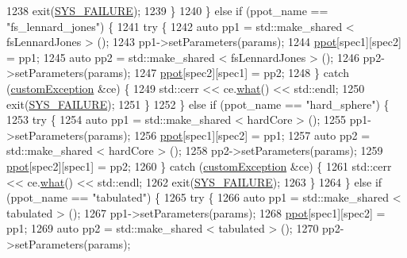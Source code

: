 \begin{DoxyCode}
1238             exit(\hyperlink{global_8h_a428dfe1ef0a6ff4b1fdebf275f6aff2e}{SYS\_FAILURE});
1239         \}
1240     \} \textcolor{keywordflow}{else} \textcolor{keywordflow}{if} (ppot\_name == \textcolor{stringliteral}{"fs\_lennard\_jones"}) \{
1241         \textcolor{keywordflow}{try} \{
1242             \textcolor{keyword}{auto} pp1 = std::make\_shared < fsLennardJones > ();
1243             pp1->setParameters(params);
1244             \hyperlink{classsim_system_ad2e290b5963f132e6a3a56cee35c8e9f}{ppot}[spec1][spec2] = pp1;
1245             \textcolor{keyword}{auto} pp2 = std::make\_shared < fsLennardJones > ();
1246             pp2->setParameters(params);
1247             \hyperlink{classsim_system_ad2e290b5963f132e6a3a56cee35c8e9f}{ppot}[spec2][spec1] = pp2;
1248         \} \textcolor{keywordflow}{catch} (\hyperlink{classcustom_exception}{customException} &ce) \{
1249             std::cerr << ce.\hyperlink{classcustom_exception_aeb6ab5848b038adfc68fde86a512f691}{what}() << std::endl;
1250             exit(\hyperlink{global_8h_a428dfe1ef0a6ff4b1fdebf275f6aff2e}{SYS\_FAILURE});
1251         \}
1252     \} \textcolor{keywordflow}{else} \textcolor{keywordflow}{if} (ppot\_name == \textcolor{stringliteral}{"hard\_sphere"}) \{
1253         \textcolor{keywordflow}{try} \{
1254             \textcolor{keyword}{auto} pp1 = std::make\_shared < hardCore > ();
1255             pp1->setParameters(params);
1256             \hyperlink{classsim_system_ad2e290b5963f132e6a3a56cee35c8e9f}{ppot}[spec1][spec2] = pp1;
1257             \textcolor{keyword}{auto} pp2 = std::make\_shared < hardCore > ();
1258             pp2->setParameters(params);
1259             \hyperlink{classsim_system_ad2e290b5963f132e6a3a56cee35c8e9f}{ppot}[spec2][spec1] = pp2;
1260         \} \textcolor{keywordflow}{catch} (\hyperlink{classcustom_exception}{customException} &ce) \{
1261             std::cerr << ce.\hyperlink{classcustom_exception_aeb6ab5848b038adfc68fde86a512f691}{what}() << std::endl;
1262             exit(\hyperlink{global_8h_a428dfe1ef0a6ff4b1fdebf275f6aff2e}{SYS\_FAILURE});
1263         \}
1264     \} \textcolor{keywordflow}{else} \textcolor{keywordflow}{if} (ppot\_name == \textcolor{stringliteral}{"tabulated"}) \{
1265         \textcolor{keywordflow}{try} \{
1266             \textcolor{keyword}{auto} pp1 = std::make\_shared < tabulated > ();
1267             pp1->setParameters(params);
1268             \hyperlink{classsim_system_ad2e290b5963f132e6a3a56cee35c8e9f}{ppot}[spec1][spec2] = pp1;
1269             \textcolor{keyword}{auto} pp2 = std::make\_shared < tabulated > ();
1270             pp2->setParameters(params);

\end{DoxyCode}
